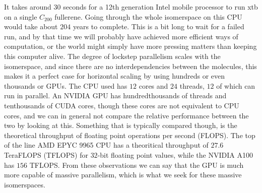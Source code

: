 It takes around $30$ seconds for a 12th generation Intel mobile processor to run xtb on a single $C_{200}$ fullerene. Going through the whole isomerspace on this CPU would take about $204$ years to complete. This is a bit long to wait for a failed run, and by that time we will probably have achieved more efficient ways of computation, or the world might simply have more pressing matters than keeping this computer alive. The degree of lockstep parallelism scales with the isomerspace, and since there are no interdependencies between the molecules, this makes it a perfect case for horizontal scaling by using hundreds or even thousands or GPUs. The CPU used has $12$ cores and $24$ threads, $12$ of which can run in parallel. An NVIDIA GPU has hundredthousands of threads and tenthousands of CUDA cores, though these cores are not equivalent to CPU cores, and we can in general not compare the relative performance between the two by looking at this. Something that is typically compared though, is the theoretical throughput of floating point operations per second (FLOPS). The top of the line AMD EPYC 9965 CPU has a theoritical throughput of $27.6$ TeraFLOPS (TFLOPS) for $32$-bit floating point values\cite{amd-epyc-performance}, while the NVIDIA A100 has $156$ TFLOPS\cite{nvidia-a100-architecture}. From these observations we can say that the GPU is much more capable of massive parallelism, which is what we seek for these massive isomerspaces.




